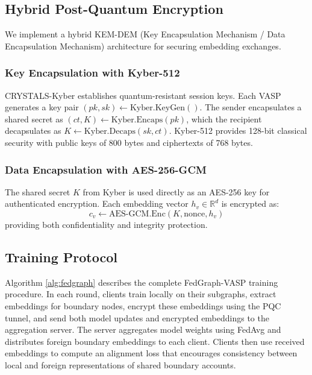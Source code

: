 \documentclass[conference]{IEEEtran}
\begin{document}
\subsection{Hybrid Post-Quantum Encryption}

We implement a hybrid KEM-DEM (Key Encapsulation Mechanism / Data Encapsulation Mechanism) architecture for securing embedding exchanges.

\subsubsection{Key Encapsulation with Kyber-512}
CRYSTALS-Kyber establishes quantum-resistant session keys. Each VASP generates a key pair $(pk, sk) \leftarrow \text{Kyber.KeyGen}()$. The sender encapsulates a shared secret as $(ct, K) \leftarrow \text{Kyber.Encaps}(pk)$, which the recipient decapsulates as $K \leftarrow \text{Kyber.Decaps}(sk, ct)$. Kyber-512 provides 128-bit classical security with public keys of 800 bytes and ciphertexts of 768 bytes.

\subsubsection{Data Encapsulation with AES-256-GCM}
The shared secret $K$ from Kyber is used directly as an AES-256 key for authenticated encryption. Each embedding vector $h_v \in \mathbb{R}^d$ is encrypted as:
\begin{equation}
c_v \leftarrow \text{AES-GCM.Enc}(K, \text{nonce}, h_v)
\end{equation}
providing both confidentiality and integrity protection.

\subsection{Training Protocol}

Algorithm \ref{alg:fedgraph} describes the complete FedGraph-VASP training procedure. In each round, clients train locally on their subgraphs, extract embeddings for boundary nodes, encrypt these embeddings using the PQC tunnel, and send both model updates and encrypted embeddings to the aggregation server. The server aggregates model weights using FedAvg and distributes foreign boundary embeddings to each client. Clients then use received embeddings to compute an alignment loss that encourages consistency between local and foreign representations of shared boundary accounts.
\end{document}
